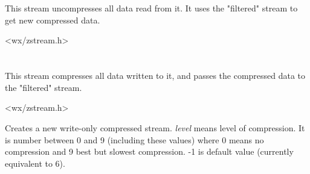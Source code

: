 \section{}\label{wxzlibinputstream}

This stream uncompresses all data read from it. It uses the "filtered"
stream to get new compressed data.




<wx/zstream.h>



\section{}\label{wxzliboutputstream}

This stream compresses all data written to it, and passes the compressed data
to the "filtered" stream.




<wx/zstream.h>







Creates a new write-only compressed stream. {\it level} means level of 
compression. It is number between 0 and 9 (including these values) where
0 means no compression and 9 best but slowest compression. -1 is default
value (currently equivalent to 6).

